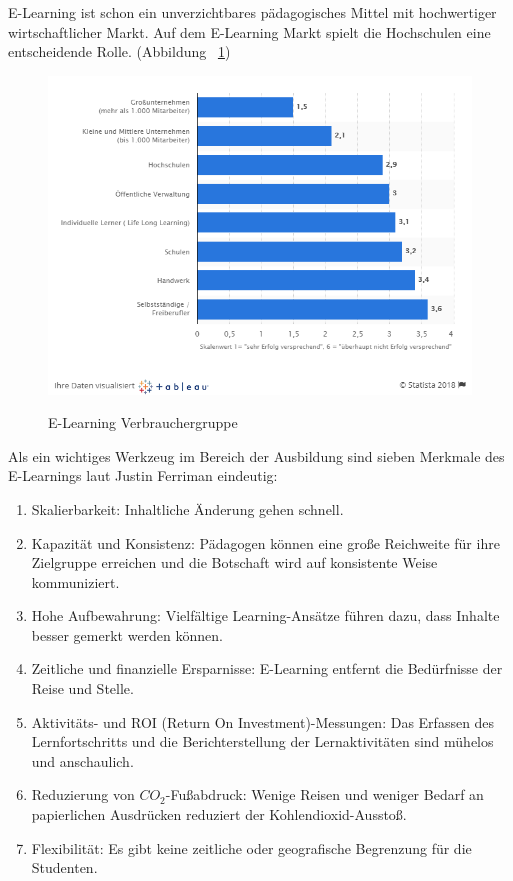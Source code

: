 E-Learning ist schon ein unverzichtbares pädagogisches Mittel mit hochwertiger wirtschaftlicher Markt. Auf dem E-Learning Markt spielt die Hochschulen eine entscheidende Rolle. (Abbildung ~\ref{fig:zielgruppe})

\begin{figure}[ht]
\vspace*{1em}
\centering
\caption[E-Learning Verbrauchergruppe]{E-Learning Verbrauchergruppe}
\includegraphics[width=\textwidth]{images/zielgruppe.png}
\label{fig:zielgruppe} 
\end{figure}

Als ein wichtiges Werkzeug im Bereich der Ausbildung sind sieben Merkmale des E-Learnings laut Justin Ferriman \citep{6} eindeutig:

\begin{enumerate}
\item Skalierbarkeit: Inhaltliche Änderung gehen schnell. 
\item Kapazität und Konsistenz: Pädagogen können eine große Reichweite für ihre Zielgruppe erreichen und die Botschaft wird auf konsistente Weise kommuniziert.
\item Hohe Aufbewahrung: Vielfältige Learning-Ansätze führen dazu, dass Inhalte besser gemerkt werden können.
\item Zeitliche und finanzielle Ersparnisse: E-Learning entfernt die Bedürfnisse der Reise und Stelle.
\item Aktivitäts- und ROI (Return On Investment)-Messungen: Das Erfassen des Lernfortschritts und die Berichterstellung der Lernaktivitäten sind mühelos und anschaulich.
\item Reduzierung von $CO_{2}$-Fußabdruck: Wenige Reisen und weniger Bedarf an papierlichen Ausdrücken reduziert der Kohlendioxid-Ausstoß.
\item Flexibilität: Es gibt keine zeitliche oder geografische Begrenzung für die Studenten.
\end{enumerate}\

